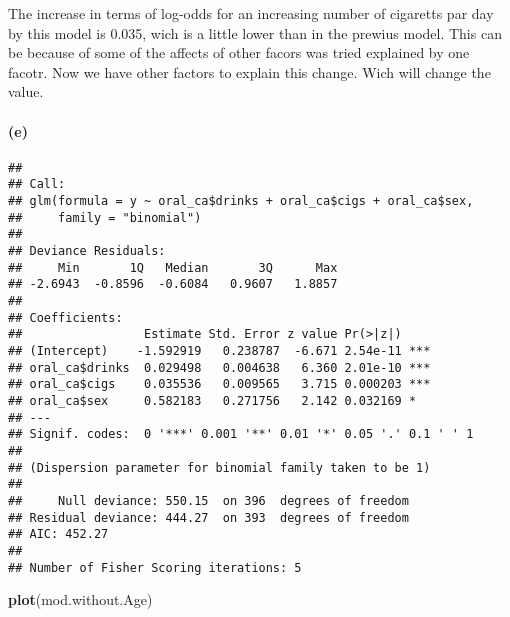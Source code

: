 \documentclass[
]{article}
\newenvironment{Shaded}{\begin{snugshade}}{\end{snugshade}}
\newcommand{\DataTypeTok}[1]{\textcolor[rgb]{0.13,0.29,0.53}{#1}}
\newcommand{\KeywordTok}[1]{\textcolor[rgb]{0.13,0.29,0.53}{\textbf{#1}}}
\newcommand{\NormalTok}[1]{#1}
\newcommand{\OperatorTok}[1]{\textcolor[rgb]{0.81,0.36,0.00}{\textbf{#1}}}
\newcommand{\StringTok}[1]{\textcolor[rgb]{0.31,0.60,0.02}{#1}}
\begin{document}
The increase in terms of log-odds for an increasing number of cigaretts
par day by this model is 0.035, wich is a little lower than in the
prewius model. This can be because of some of the affects of other
facors was tried explained by one facotr. Now we have other factors to
explain this change. Wich will change the value.

\hypertarget{e-1}{%
\paragraph{(e)}\label{e-1}}

\begin{Shaded}
\end{Shaded}

\begin{verbatim}
## 
## Call:
## glm(formula = y ~ oral_ca$drinks + oral_ca$cigs + oral_ca$sex, 
##     family = "binomial")
## 
## Deviance Residuals: 
##     Min       1Q   Median       3Q      Max  
## -2.6943  -0.8596  -0.6084   0.9607   1.8857  
## 
## Coefficients:
##                 Estimate Std. Error z value Pr(>|z|)    
## (Intercept)    -1.592919   0.238787  -6.671 2.54e-11 ***
## oral_ca$drinks  0.029498   0.004638   6.360 2.01e-10 ***
## oral_ca$cigs    0.035536   0.009565   3.715 0.000203 ***
## oral_ca$sex     0.582183   0.271756   2.142 0.032169 *  
## ---
## Signif. codes:  0 '***' 0.001 '**' 0.01 '*' 0.05 '.' 0.1 ' ' 1
## 
## (Dispersion parameter for binomial family taken to be 1)
## 
##     Null deviance: 550.15  on 396  degrees of freedom
## Residual deviance: 444.27  on 393  degrees of freedom
## AIC: 452.27
## 
## Number of Fisher Scoring iterations: 5
\end{verbatim}

\begin{Shaded}
\begin{Highlighting}[]
\KeywordTok{plot}\NormalTok{(mod.without.Age)}
\end{Highlighting}
\end{Shaded}
\end{document}
